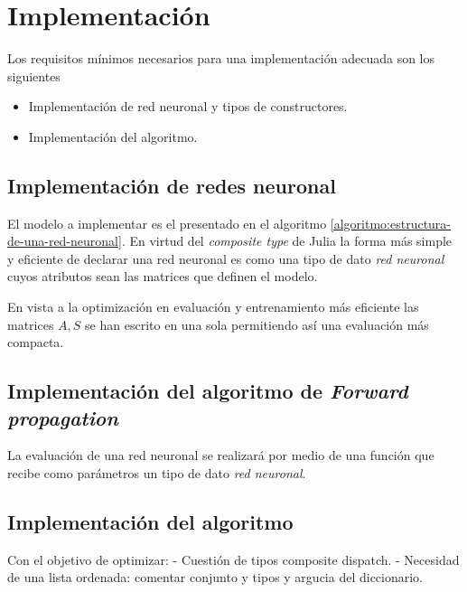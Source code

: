 
\section{Implementación}
\label{ch07:Implementar} 

Los requisitos mínimos necesarios para una implementación adecuada son los siguientes
\begin{itemize}
    \item Implementación de red neuronal y tipos de constructores.
    \item Implementación del algoritmo. 
\end{itemize}

\subsection*{Implementación de redes neuronal}

El modelo  a implementar es el presentado en el algoritmo \ref{algoritmo:estructura-de-una-red-neuronal}. En virtud del \textit{composite type} de Julia  la forma más simple y eficiente de 
declarar una red neuronal es como una tipo de dato \textit{red neuronal} cuyos atributos sean las matrices que definen el modelo. 

En vista a la optimización en evaluación y 
entrenamiento más eficiente las matrices 
$A, S$ se han escrito en una sola permitiendo así una evaluación más compacta. 

\subsection*{Implementación del algoritmo de \textit{Forward propagation}}  
La evaluación de una red neuronal se realizará por 
medio de una función que recibe como parámetros un 
tipo de dato \textit{red neuronal}. 

\subsection*{Implementación del algoritmo}

Con el objetivo de optimizar: 
- Cuestión de tipos composite dispatch. 
- Necesidad de una lista ordenada: comentar conjunto y tipos
y argucia del diccionario. 
 
